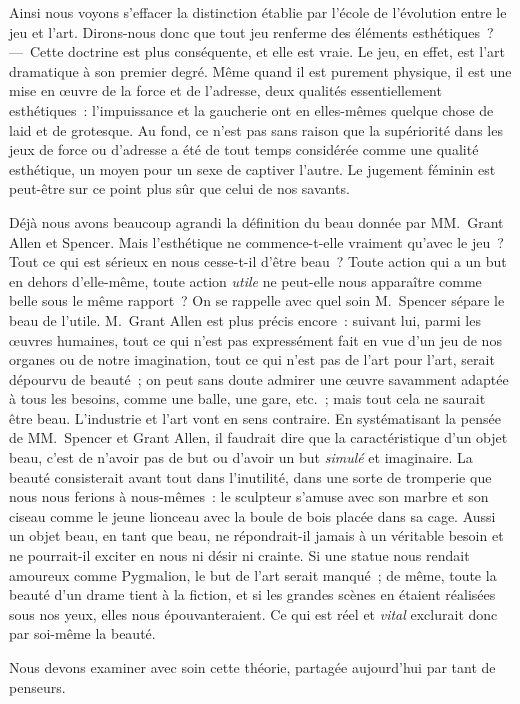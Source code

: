 \documentclass[french,twoside]{book} %
\begin{document}
Ainsi nous voyons s’effacer la distinction établie par l’école de l’évolution entre le jeu et l’art. Dirons-nous donc que tout jeu renferme des éléments esthétiques ? — Cette doctrine est plus conséquente, et elle est vraie. Le jeu, en effet, est l’art dramatique à son premier degré. Même quand il est purement physique, il est une mise en œuvre de la force et de l’adresse, deux qualités essentiellement esthétiques : l’impuissance et la gaucherie ont en elles-mêmes quelque chose de laid et de grotesque. Au fond, ce n’est pas sans raison que la supériorité dans les jeux de force ou d’adresse a été de tout temps considérée comme une qualité esthétique, un moyen pour un sexe de captiver l’autre. Le jugement féminin est peut-être sur ce point plus sûr que celui de nos savants.\par
Déjà nous avons beaucoup agrandi la définition du beau donnée par MM. Grant Allen et Spencer. Mais l’esthétique ne commence-t-elle vraiment qu’avec le jeu ? Tout ce qui est sérieux en nous cesse-t-il d’être beau ? Toute action qui a un but en dehors d’elle-même, toute action \emph{utile} ne peut-elle nous apparaître comme belle sous le même rapport ? On se rappelle avec quel soin M. Spencer sépare le beau de l’utile. M. Grant Allen est plus précis encore :  suivant lui, parmi les œuvres humaines, tout ce qui n’est pas expressément fait en vue d’un jeu de nos organes ou de notre imagination, tout ce qui n’est pas de l’art pour l’art, serait dépourvu de beauté ; on peut sans doute admirer une œuvre savamment adaptée à tous les besoins, comme une balle, une gare, etc. ; mais tout cela ne saurait être beau. L’industrie et l’art vont en sens contraire. En systématisant la pensée de MM. Spencer et Grant Allen, il faudrait dire que la caractéristique d’un objet beau, c’est de n’avoir pas de but ou d’avoir un but \emph{simulé} et imaginaire. La beauté consisterait avant tout dans l’inutilité, dans une sorte de tromperie que nous nous ferions à nous-mêmes : le sculpteur s’amuse avec son marbre et son ciseau comme le jeune lionceau avec la boule de bois placée dans sa cage. Aussi un objet beau, en tant que beau, ne répondrait-il jamais à un véritable besoin et ne pourrait-il exciter en nous ni désir ni crainte. Si une statue nous rendait amoureux comme Pygmalion, le but de l’art serait manqué ; de même, toute la beauté d’un drame tient à la fiction, et si les grandes scènes en étaient réalisées sous nos yeux, elles nous épouvanteraient. Ce qui est réel et \emph{vital} exclurait donc par soi-même la beauté.\par
Nous devons examiner avec soin cette théorie, partagée aujourd’hui par tant de penseurs.
\end{document}
